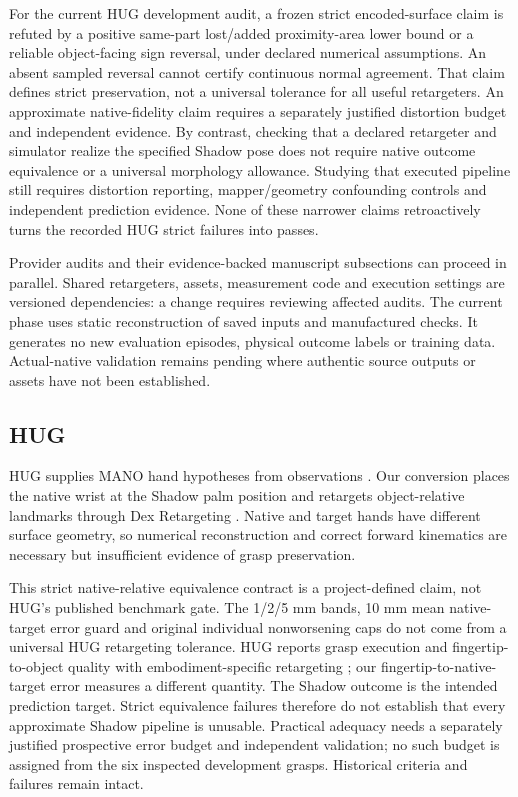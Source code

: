 \documentclass[10pt,letterpaper]{article}
\begin{document}
For the current HUG development audit, a frozen strict encoded-surface claim
is refuted by a positive same-part lost/added proximity-area lower bound or a
reliable object-facing sign reversal, under declared numerical assumptions.
An absent sampled reversal cannot certify continuous normal agreement. That
claim defines strict preservation, not a universal tolerance for all useful
retargeters. An approximate native-fidelity claim requires a separately
justified distortion budget and independent evidence. By contrast, checking
that a declared retargeter and simulator realize the specified Shadow pose
does not require native outcome equivalence or a universal morphology
allowance. Studying that executed pipeline still requires distortion reporting,
mapper/geometry confounding controls and independent prediction evidence.
None of these narrower claims retroactively turns the recorded HUG strict
failures into passes.

Provider audits and their evidence-backed manuscript subsections can proceed
in parallel. Shared retargeters, assets, measurement code and execution settings
are versioned dependencies: a change requires reviewing affected audits.
The current phase uses static reconstruction of saved inputs and manufactured
checks. It generates no new evaluation episodes, physical outcome labels or
training data. Actual-native validation remains pending where authentic source
outputs or assets have not been established.

\subsection{HUG}
HUG supplies MANO hand hypotheses from observations \cite{hug}. Our conversion
places the native wrist at the Shadow palm position and retargets object-relative
landmarks through Dex Retargeting \cite{dex}. Native and target hands have
different surface geometry, so numerical reconstruction and correct forward
kinematics are necessary but insufficient evidence of grasp preservation.

This strict native-relative equivalence contract is a project-defined claim,
not HUG's published benchmark gate. The 1/2/5 mm bands, 10 mm mean
native-target error guard and original individual nonworsening caps do not
come from a universal HUG retargeting tolerance. HUG reports grasp execution
and fingertip-to-object quality with embodiment-specific retargeting
\cite{hug}; our fingertip-to-native-target error measures a different quantity.
The Shadow outcome is the intended prediction target. Strict equivalence
failures therefore do not establish that every approximate Shadow pipeline is
unusable. Practical adequacy needs a separately justified prospective error
budget and independent validation; no such budget is assigned from the six
inspected development grasps. Historical criteria and failures remain intact.
\end{document}
